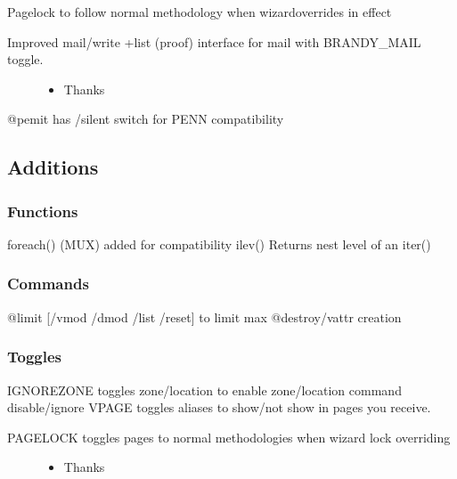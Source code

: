 \documentclass[letterpaper,10pt,english]{sphinxmanual}
\begin{document}
\sphinxAtStartPar
Pagelock to follow normal methodology when wizard\sphinxhyphen{}overrides in effect
\begin{description}
\item[{Improved mail/write +list (proof) interface for mail with BRANDY\_MAIL toggle.}] \leavevmode\begin{itemize}
\item {} 
\sphinxAtStartPar
Thanks 

\end{itemize}

\end{description}

\sphinxAtStartPar
@pemit has /silent switch for PENN compatibility


\subsection{Additions}
\label{\detokenize{changelog:id41}}

\subsubsection{Functions}
\label{\detokenize{changelog:id42}}
\sphinxAtStartPar
foreach() \sphinxhyphen{} (MUX) added for compatibility
ilev() \sphinxhyphen{} Returns nest level of an iter()


\subsubsection{Commands}
\label{\detokenize{changelog:id43}}
\sphinxAtStartPar
@limit {[}/vmod /dmod /list /reset{]} \sphinxhyphen{} to limit max @destroy/vattr creation


\subsubsection{Toggles}
\label{\detokenize{changelog:id44}}
\sphinxAtStartPar
IGNOREZONE \sphinxhyphen{} toggles zone/location to enable zone/location command disable/ignore
VPAGE \sphinxhyphen{} toggles aliases to show/not show in pages you receive.
\begin{description}
\item[{PAGELOCK \sphinxhyphen{} toggles pages to normal methodologies when wizard lock overriding}] \leavevmode\begin{itemize}
\item {} 
\sphinxAtStartPar
Thanks 

\end{itemize}

\end{description}
\end{document}
